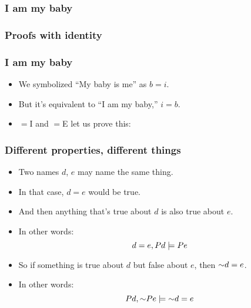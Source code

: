 \begin{frame}
  \frametitle{I am my baby}

  \begin{fitchproof}
\end{fitchproof}
\end{frame}

\begin{frame}
  \frametitle{Proofs with identity}
  
  \begin{fitchproof}
     
  \end{fitchproof}
  
  \begin{fitchproof}
     
  \end{fitchproof}
  \begin{fitchproof}
     
  \end{fitchproof}
\end{frame}

\begin{frame}
  \frametitle{I am my baby}

  \begin{itemize}
    \item We symbolized ``My baby is me'' as $b = i$.
    \item But it's equivalent to ``I am my baby,'' $i = b$.
    \item $=$I and $=$E let us prove this:
    \begin{fitchproof}
    \end{fitchproof}
  \end{itemize}
\end{frame}

\begin{frame}
  \frametitle{Different properties, different things}

  \begin{itemize}[<+->]
    \item Two names $d$, $e$ may name the same thing.
    \item In that case, $d = e$ would be true.
    \item And then anything that's true about $d$ is also true about $e$.
    \item In other words: \[d=e,Pd \models Pe\]
    \item So if something is true about $d$ but false about $e$, then $\enot d = e$. 
    \item In other words:
    \[P\qv{d}, \enot P\qv{e} \models \enot d = e\]
  \end{itemize}
\end{frame}

